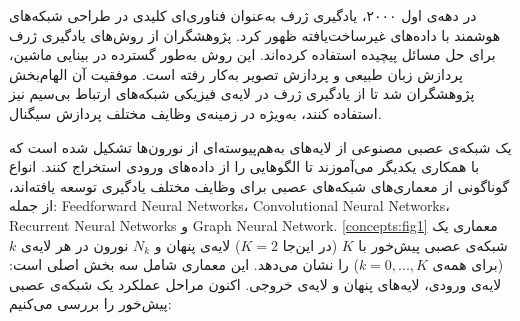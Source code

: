 در دهه‌ی اول ۲۰۰۰، یادگیری ژرف به‌عنوان فناوری‌ای کلیدی در طراحی شبکه‌های هوشمند با داده‌های غیرساخت‌یافته ظهور کرد. پژوهشگران از روش‌های یادگیری ژرف برای حل مسائل پیچیده استفاده کرده‌اند. این روش به‌طور گسترده در بینایی ماشین، پردازش زبان طبیعی و پردازش تصویر به‌کار رفته است. موفقیت آن الهام‌بخش پژوهشگران شد تا از یادگیری ژرف در لایه‌ی فیزیکی شبکه‌های ارتباط بی‌سیم نیز استفاده کنند، به‌ویژه در زمینه‌ی وظایف مختلف پردازش سیگنال.

یک شبکه‌ی عصبی مصنوعی از لایه‌های به‌هم‌پیوسته‌ای از نورون‌ها تشکیل شده است که با همکاری یکدیگر می‌آموزند تا الگوهایی را از داده‌های ورودی استخراج کنند. انواع گوناگونی از معماری‌های شبکه‌های عصبی برای وظایف مختلف یادگیری توسعه یافته‌اند، از جمله: 
\glspl{Feedforward Neural Network}،
\glspl{Convolutional Neural Network}،
\glspl{Recurrent Neural Network}
 و 
\gls{Graph Neural Network}.
\autoref{concepts:fig1}
 معماری یک شبکه‌ی عصبی پیش‌خور با 
$K$
(در این‌جا 
$K=2$)
لایه‌ی پنهان و
$N_{k}$
نورون در هر لایه‌ی 
$k$
(برای همه‌ی
$k = 0,...,K$) 
     را نشان می‌دهد. این معماری شامل سه بخش اصلی است: لایه‌ی ورودی، لایه‌های پنهان و لایه‌ی خروجی.
اکنون مراحل عملکرد یک شبکه‌ی عصبی پیش‌خور را بررسی می‌کنیم:

